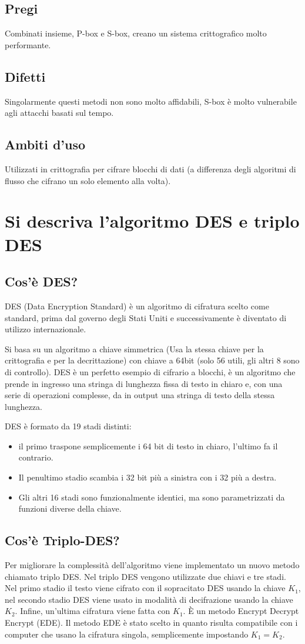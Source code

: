 \subsection{Pregi}
Combinati insieme, P-box e S-box, creano un sistema crittografico molto performante.
\subsection{Difetti}
Singolarmente questi metodi non sono molto affidabili, S-box è molto vulnerabile agli attacchi basati sul tempo.
\subsection{Ambiti d'uso}
Utilizzati in crittografia per cifrare blocchi di dati (a differenza degli algoritmi di flusso che cifrano un solo elemento alla volta).

\section{Si descriva l’algoritmo DES e triplo DES}
\subsection{Cos'è DES?}
DES (Data Encryption Standard) è un algoritmo di cifratura scelto come standard, prima dal governo degli Stati Uniti e successivamente è diventato di utilizzo internazionale.

Si basa su un algoritmo a chiave simmetrica (Usa la stessa chiave per la crittografia e per la decrittazione) con chiave a 64bit (solo 56 utili, gli altri 8 sono di controllo).
DES è un perfetto esempio di cifrario a blocchi, è un algoritmo che prende in ingresso una stringa di lunghezza fissa di testo in chiaro e, con una serie di operazioni complesse, da in output una stringa di testo della stessa lunghezza.

DES è formato da 19 stadi distinti:
\begin{itemize}
\item	il primo traspone semplicemente i 64 bit di testo in chiaro, l’ultimo fa il contrario.
\item	Il penultimo stadio scambia i 32 bit più a sinistra con i 32 più a destra.
\item	Gli altri 16 stadi sono funzionalmente identici, ma sono parametrizzati da funzioni diverse della chiave.
\end{itemize}

\subsection{Cos'è Triplo-DES?}
Per migliorare la complessità dell’algoritmo viene implementato un nuovo metodo chiamato triplo DES. Nel triplo DES vengono utilizzate due chiavi e tre stadi. Nel primo stadio il testo viene cifrato con il sopracitato DES usando la chiave $K_1$, nel secondo stadio DES viene usato in modalità di decifrazione usando la chiave $K_2$. Infine, un’ultima cifratura viene fatta con $K_1$. È un metodo Encrypt Decrypt Encrypt (EDE). Il metodo EDE è stato scelto in quanto risulta compatibile con i computer che usano la cifratura singola, semplicemente impostando $K_1=K_2$.

